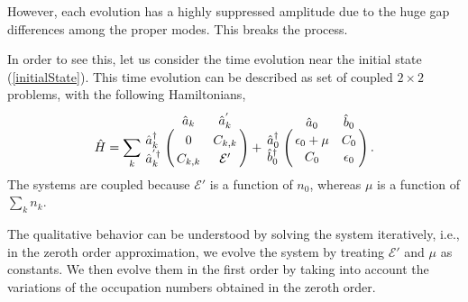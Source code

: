 \documentclass[aps,prd,reprint,superscriptaddress,nofootinbib]{revtex4-2}
\newcommand*{\ie}{i.e., }
\begin{document}
However, each evolution has a highly suppressed amplitude due to 
the huge gap differences among the proper modes. 
This breaks the process.  

In order to see this, let us consider the time evolution near the 
initial state  (\ref{initialState}). This time evolution can be described
as set of coupled $2\times 2$ problems, with the following Hamiltonians, 
\begin{equation} \label{mass2}
\hat{H}= \sum_k \bordermatrix{
	& \hat{a}_k	& \hat{a}_k^{'} 	\cr
	\hat{a}_k^{\dagger}	& 0	& C_{k,k} 	\cr
	\hat{a}_k^{'\dagger}	& C_{k,k} 	& {\mathcal E}'	\cr
} + 
\bordermatrix{
	& \hat{a}_0	& \hat{b}_0 	\cr
	\hat{a}_0^{\dagger}	& \epsilon_0 + \mu	& C_{0} 	\cr
	\hat{b}_0^{\dagger}	& C_{0} 	& \epsilon_0	\cr
}  \,.
\end{equation}
The systems are coupled because ${\mathcal E}'$ is 
a function of $n_0$, whereas $\mu$ is a function of
$\sum_k n_k$.  

The qualitative behavior can be understood  by solving the system iteratively, \ie in the zeroth order approximation, we evolve 
the system by treating  ${\mathcal E}'$ and $\mu$ as constants. 
We then evolve them in the first order by taking into account the variations 
of the occupation numbers obtained in the zeroth order. 
\end{document}
